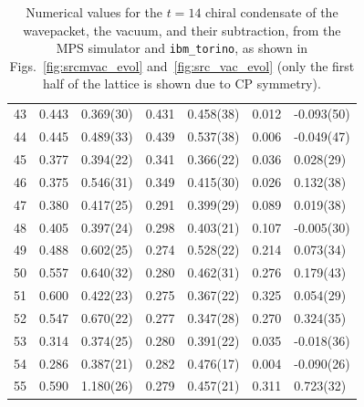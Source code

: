 \documentclass[aps, prc, tightenlines,superscriptaddress, letterpaper, amsmath, amssymb, preprintnumbers, floatfix, longbibliography, nofootinbib]{revtex4-2}
\begin{document}
\begin{table}[!htb]
{\begin{tabularx}{\textwidth}{| c || Y | Y | Y | Y | Y | Y |}
43	&	0.443	&	0.369(30)	&	0.431	&	0.458(38)	&	0.012	&	-0.093(50)	\\
44	&	0.445	&	0.489(33)	&	0.439	&	0.537(38)	&	0.006	&	-0.049(47)	\\
45	&	0.377	&	0.394(22)	&	0.341	&	0.366(22)	&	0.036	&	0.028(29)	\\
46	&	0.375	&	0.546(31)	&	0.349	&	0.415(30)	&	0.026	&	0.132(38)	\\
47	&	0.380	&	0.417(25)	&	0.291	&	0.399(29)	&	0.089	&	0.019(38)	\\
48	&	0.405	&	0.397(24)	&	0.298	&	0.403(21)	&	0.107	&	-0.005(30)	\\
49	&	0.488	&	0.602(25)	&	0.274	&	0.528(22)	&	0.214	&	0.073(34)	\\
50	&	0.557	&	0.640(32)	&	0.280	&	0.462(31)	&	0.276	&	0.179(43)	\\
51	&	0.600	&	0.422(23)	&	0.275	&	0.367(22)	&	0.325	&	0.054(29)	\\
52	&	0.547	&	0.670(22)	&	0.277	&	0.347(28)	&	0.270	&	0.324(35)	\\
53	&	0.314	&	0.374(25)	&	0.280	&	0.391(22)	&	0.035	&	-0.018(36)	\\
54	&	0.286	&	0.387(21)	&	0.282	&	0.476(17)	&	0.004	&	-0.090(26)	\\
55	&	0.590	&	1.180(26)	&	0.279	&	0.457(21)	&	0.311	&	0.723(32)	\\\hline
\end{tabularx}}
\caption{Numerical values for the $t=14$ chiral condensate of the wavepacket, the vacuum, and their subtraction, from the MPS simulator and {\tt ibm\_torino}, as shown in Figs.~\ref{fig:srcmvac_evol} and~\ref{fig:src_vac_evol} (only the first half of the lattice is shown due to CP symmetry).}
 \label{tab:tablet14}
\end{table}
%

\FloatBarrier

\end{document}
